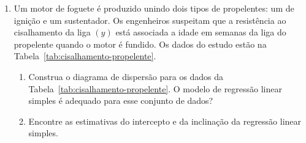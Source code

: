 \documentclass[12pt, a4paper]{article}
\begin{document}
\begin{enumerate}
	\item Um motor de foguete é produzido unindo dois tipos de propelentes: um  de ignição e um sustentador. Os engenheiros suspeitam que a resistência ao cisalhamento da liga $(y)$ está associada a idade em semanas da liga do propelente quando o motor é fundido. Os  dados do estudo estão na Tabela~\ref{tab:cisalhamento-propelente}.
	\begin{table}[ht]
		\centering
		\caption{Resistência ao cisalhamento (psi) e Idade do propelente quando o motor é fundido.} 
		\label{tab:cisalhamento-propelente}
	\end{table}
	\begin{enumerate}
		\item Construa o diagrama de dispersão para os dados da Tabela~\ref{tab:cisalhamento-propelente}. O modelo de  regressão linear simples é adequado para esse conjunto de dados?
		\item Encontre as estimativas do intercepto e da inclinação da regressão linear simples.

\end{enumerate}
\end{enumerate}
\end{document}

